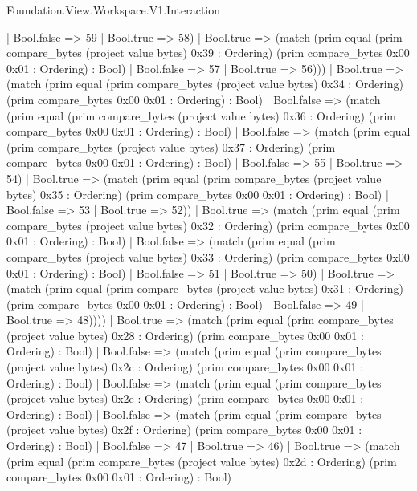 \begin{lexlean}{Foundation.View.Workspace.V1.Interaction}
\begin{semanticmodule}
{                    | Bool.false => 59
                    | Bool.true => 58)
                  | Bool.true => (match (prim equal (prim compare_bytes (project value bytes) 0x39 : Ordering) (prim compare_bytes 0x00 0x01 : Ordering) : Bool)
                    | Bool.false => 57
                    | Bool.true => 56)))
              | Bool.true => (match (prim equal (prim compare_bytes (project value bytes) 0x34 : Ordering) (prim compare_bytes 0x00 0x01 : Ordering) : Bool)
                | Bool.false => (match (prim equal (prim compare_bytes (project value bytes) 0x36 : Ordering) (prim compare_bytes 0x00 0x01 : Ordering) : Bool)
                  | Bool.false => (match (prim equal (prim compare_bytes (project value bytes) 0x37 : Ordering) (prim compare_bytes 0x00 0x01 : Ordering) : Bool)
                    | Bool.false => 55
                    | Bool.true => 54)
                  | Bool.true => (match (prim equal (prim compare_bytes (project value bytes) 0x35 : Ordering) (prim compare_bytes 0x00 0x01 : Ordering) : Bool)
                    | Bool.false => 53
                    | Bool.true => 52))
                | Bool.true => (match (prim equal (prim compare_bytes (project value bytes) 0x32 : Ordering) (prim compare_bytes 0x00 0x01 : Ordering) : Bool)
                  | Bool.false => (match (prim equal (prim compare_bytes (project value bytes) 0x33 : Ordering) (prim compare_bytes 0x00 0x01 : Ordering) : Bool)
                    | Bool.false => 51
                    | Bool.true => 50)
                  | Bool.true => (match (prim equal (prim compare_bytes (project value bytes) 0x31 : Ordering) (prim compare_bytes 0x00 0x01 : Ordering) : Bool)
                    | Bool.false => 49
                    | Bool.true => 48))))
            | Bool.true => (match (prim equal (prim compare_bytes (project value bytes) 0x28 : Ordering) (prim compare_bytes 0x00 0x01 : Ordering) : Bool)
              | Bool.false => (match (prim equal (prim compare_bytes (project value bytes) 0x2c : Ordering) (prim compare_bytes 0x00 0x01 : Ordering) : Bool)
                | Bool.false => (match (prim equal (prim compare_bytes (project value bytes) 0x2e : Ordering) (prim compare_bytes 0x00 0x01 : Ordering) : Bool)
                  | Bool.false => (match (prim equal (prim compare_bytes (project value bytes) 0x2f : Ordering) (prim compare_bytes 0x00 0x01 : Ordering) : Bool)
                    | Bool.false => 47
                    | Bool.true => 46)
                  | Bool.true => (match (prim equal (prim compare_bytes (project value bytes) 0x2d : Ordering) (prim compare_bytes 0x00 0x01 : Ordering) : Bool)
}
\end{semanticmodule}
\end{lexlean}
